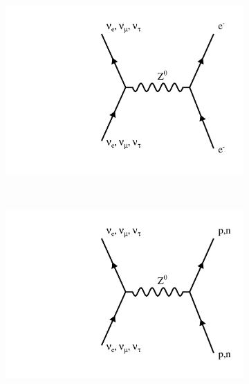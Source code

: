 \begin{figure}[t]
\centering
\begin{subfigure}[b]{0.3\textwidth}
                \centering
                \includegraphics[width=\textwidth]{feynman/ncElec.pdf}
                \caption{}
                 \label{ncElec}
        \end{subfigure}
        ~
\begin{subfigure}[b]{0.3\textwidth}
                \centering
                \includegraphics[width=\textwidth]{feynman/ncHad.pdf}
                \caption{}
                 \label{ncHad}
        \end{subfigure}      
        ~
        \begin{subfigure}[b]{0.3\textwidth}
                \centering

\end{subfigure}
\end{figure}
